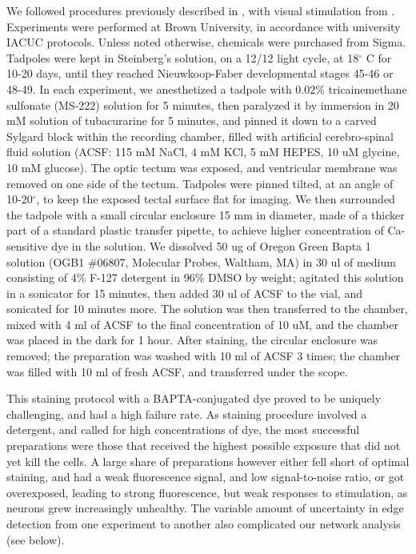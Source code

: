 \documentclass{article}
\begin{document}
We followed procedures previously described in \citep{xu2011,truszkowski2017}, with visual stimulation from \citep{khakhalin2014}. Experiments were performed at Brown University, in accordance with university IACUC protocols. Unless noted otherwise, chemicals were purchased from Sigma. Tadpoles were kept in Steinberg’s solution, on a 12/12 light cycle, at 18$^\circ$ C for 10-20 days, until they reached Nieuwkoop-Faber developmental stages 45-46 or 48-49. In each experiment, we anesthetized a tadpole with 0.02\% tricainemethane sulfonate (MS-222) solution for 5 minutes, then paralyzed it by immersion in 20 mM solution of tubacurarine for 5 minutes, and pinned it down to a carved Sylgard block within the recording chamber, filled with artificial cerebro-spinal fluid solution (ACSF: 115 mM NaCl, 4 mM KCl, 5 mM HEPES, 10 uM glycine, 10 mM glucose). The optic tectum was exposed, and ventricular membrane was removed on one side of the tectum. Tadpoles were pinned tilted, at an angle of 10-20$^\circ$, to keep the exposed tectal surface flat for imaging. We then surrounded the tadpole with a small circular enclosure 15 mm in diameter, made of a thicker part of a standard plastic transfer pipette, to achieve higher concentration of Ca-sensitive dye in the solution. We dissolved 50 ug of Oregon Green Bapta 1 solution (OGB1 $\#$06807, Molecular Probes, Waltham, MA) in 30 ul of medium consisting of 4\% F-127 detergent in 96\% DMSO by weight; agitated this solution in a sonicator for 15 minutes, then added 30 ul of ACSF to the vial, and sonicated for 10 minutes more. The solution was then transferred to the chamber, mixed with 4 ml of ACSF to the final concentration of 10 uM, and the chamber was placed in the dark for 1 hour. After staining, the circular enclosure was removed; the preparation was washed with 10 ml of ACSF 3 times; the chamber was filled with 10 ml of fresh ACSF, and transferred under the scope.

This staining protocol with a BAPTA-conjugated dye proved to be uniquely challenging, and had a high failure rate. As staining procedure involved a detergent, and called for high concentrations of dye, the most successful preparations were those that received the highest possible exposure that did not yet kill the cells. A large share of preparations however either fell short of optimal staining, and had a weak fluorescence signal, and low signal-to-noise ratio, or got overexposed, leading to strong fluorescence, but weak responses to stimulation, as neurons grew increasingly unhealthy. The variable amount of uncertainty in edge detection from one experiment to another also complicated our network analysis (see below).
\end{document}
